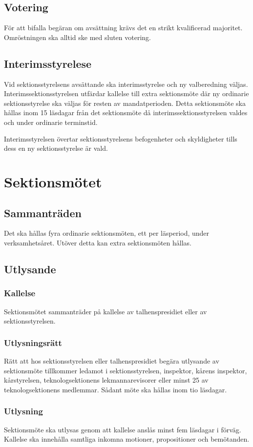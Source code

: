\documentclass[a4paper]{dtek}
\begin{document}
\subsection{Votering}
För att bifalla begäran om avsättning krävs det en strikt kvalificerad majoritet.
Omröstningen ska alltid ske med sluten votering.
\subsection{Interimsstyrelese}
Vid sektionsstyrelsens avsättande ska interimsstyrelse och ny valberedning väljas.
Interimssektionsstyrelsen utfärdar kallelse till extra sektionsmöte där ny ordinarie sektionsstyrelse ska väljas för resten av mandatperioden.
Detta sektionsmöte ska hållas inom 15 läsdagar från det sektionsmöte då interimssektionsstyrelsen valdes och under ordinarie terminstid.

Interimsstyrelsen övertar sektionsstyrelsens befogenheter och skyldigheter tills dess en ny sektionsstyrelse är vald.
\newpage

\section{Sektionsmötet}
\subsection{Sammanträden}
Det ska hållas fyra ordinarie sektionsmöten, ett per läsperiod, under verksamhetsåret. Utöver detta kan extra sektionsmöten hållas.
\subsection{Utlysande}
\subsubsection{Kallelse}
Sektionsmötet sammanträder på kallelse av talhenspresidiet eller av sektionsstyrelsen.
\subsubsection{Utlysningsrätt}
Rätt att hos sektionsstyrelsen eller talhenspresidiet begära utlysande av sektionsmöte tillkommer ledamot i sektionsstyrelsen, inspektor, kårens inspektor, kårstyrelsen, teknologsektionens lekmannarevisorer eller minst 25 av teknologsektionens medlemmar. Sådant möte ska hållas inom tio läsdagar.
\subsubsection{Utlysning}
\label{sec:sektionsmote_utlysande}
Sektionsmöte ska utlysas genom att kallelse anslås minst fem läsdagar i förväg.
Kallelse ska innehålla samtliga inkomna motioner, propositioner och bemötanden.
\end{document}

